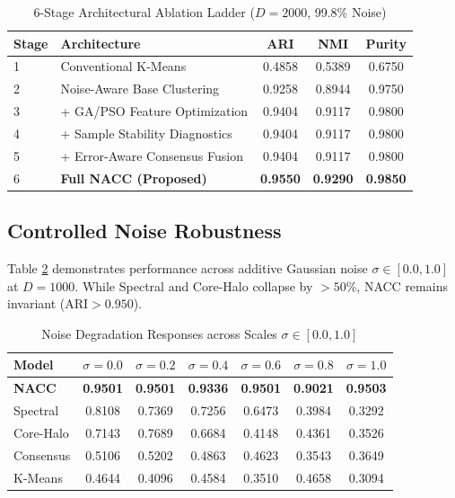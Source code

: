\documentclass[journal]{IEEEtran}
\begin{document}
\begin{table}[h]
\caption{6-Stage Architectural Ablation Ladder ($D=2000$, 99.8\% Noise)}
\label{tab:ablation}
\centering
\begin{tabular}{llccc}
\toprule
Stage & Architecture & ARI & NMI & Purity \\
\midrule
1 & Conventional K-Means & 0.4858 & 0.5389 & 0.6750 \\
2 & Noise-Aware Base Clustering & 0.9258 & 0.8944 & 0.9750 \\
3 & + GA/PSO Feature Optimization & 0.9404 & 0.9117 & 0.9800 \\
4 & + Sample Stability Diagnostics & 0.9404 & 0.9117 & 0.9800 \\
5 & + Error-Aware Consensus Fusion & 0.9404 & 0.9117 & 0.9800 \\
6 & \textbf{Full NACC (Proposed)} & \textbf{0.9550} & \textbf{0.9290} & \textbf{0.9850} \\
\bottomrule
\end{tabular}
\end{table}

\subsection{Controlled Noise Robustness}
Table \ref{tab:noise} demonstrates performance across additive Gaussian noise $\sigma \in [0.0, 1.0]$ at $D=1000$. While Spectral and Core-Halo collapse by $>50\%$, NACC remains invariant ($\text{ARI} > 0.950$).

\begin{table}[h]
\caption{Noise Degradation Responses across Scales $\sigma \in [0.0, 1.0]$}
\label{tab:noise}
\centering
\begin{tabular}{lcccccc}
\toprule
Model & $\sigma=0.0$ & $\sigma=0.2$ & $\sigma=0.4$ & $\sigma=0.6$ & $\sigma=0.8$ & $\sigma=1.0$ \\
\midrule
\textbf{NACC} & \textbf{0.9501} & \textbf{0.9501} & \textbf{0.9336} & \textbf{0.9501} & \textbf{0.9021} & \textbf{0.9503} \\
Spectral & 0.8108 & 0.7369 & 0.7256 & 0.6473 & 0.3984 & 0.3292 \\
Core-Halo & 0.7143 & 0.7689 & 0.6684 & 0.4148 & 0.4361 & 0.3526 \\
Consensus & 0.5106 & 0.5202 & 0.4863 & 0.4623 & 0.3543 & 0.3649 \\
K-Means & 0.4644 & 0.4096 & 0.4584 & 0.3510 & 0.4658 & 0.3094 \\
\bottomrule
\end{tabular}
\end{table}
\end{document}
